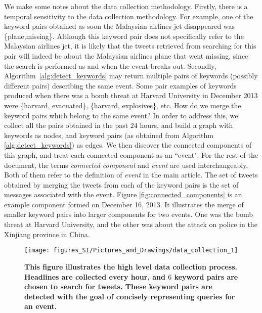 We make some notes about the data collection methodology. Firstly,
there is a temporal sensitivity to the data collection methodology.
For example, one of the keyword pairs obtained as soon the Malaysian
airlines jet disappeared was \{plane,missing\}. Although this keyword
pair does not specifically refer to the Malaysian airlines jet, it is
likely that the tweets retrieved from searching for this pair will
indeed be about the Malaysian airlines plane that went missing, since
the search is performed as and when the event breaks out. Secondly,
Algorithm~\ref{alg:detect_keywords} may return multiple pairs of
keywords (possibly different pairs) describing the same event. Some
pair examples of keywords produced when there was a bomb threat at
Harvard University in December 2013 were \{harvard, evacuated\},
\{harvard, explosives\}, etc. How do we merge the keyword pairs which
belong to the same event? In order to address this, we collect all the
pairs obtained in the past $24$ hours, and build a graph with keywords
as nodes, and keyword pairs (as obtained from Algorithm
{\ref{alg:detect_keywords}}) as edges. We then discover the connected
components of this graph, and treat each connected component as an
``event".  For the rest of the document, the terms \emph{connected component}
and \emph{event} are used interchangeably.  Both of them refer to the definition
of \emph{event} in the main article.
The set of tweets obtained
by merging the tweets from each of the keyword pairs is the set of
messages associated with the event. Figure
\ref{fig:connected_components} is an example component formed on
December 16, 2013. It illustrates the merge of smaller keyword pairs
into larger components for two events. One was the bomb threat at
Harvard University, and the other was about the attack on police in
the Xinjiang province in China.

\begin{figure}
  \texttt{[image: figures\_SI/Pictures\_and\_Drawings/data\_collection\_1]}
  \caption{\textbf{This figure illustrates the high level data
      collection process. Headlines are collected every hour, and $6$
      keyword pairs are chosen to search for tweets. These keyword
      pairs are detected with the goal of concisely representing
      queries for an event.}}
  \label{fig:data_collection_1}
\end{figure}


